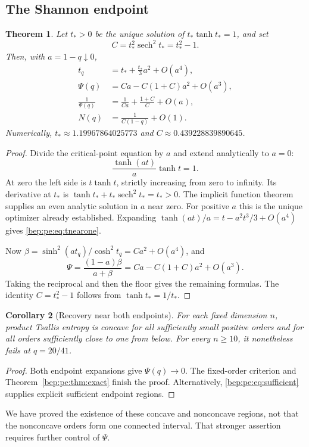 \documentclass[11pt]{article}
\numberwithin{equation}{section}
\newtheorem{theorem}{Theorem}[section]
\newtheorem{corollary}[theorem]{Corollary}
\theoremstyle{definition}
\theoremstyle{remark}
\newcommand{\sech}{\operatorname{sech}}
\begin{document}
\subsection{The Shannon endpoint}
\begin{theorem}\label{bep:pe:thm:nearone}
Let $t_*>0$ be the unique solution of $t_*\tanh t_*=1$, and set
\begin{equation}
 C=t_*^2\sech^2t_*=t_*^2-1.
\end{equation}
Then, with $a=1-q\downarrow0$,
\begin{align}
 t_q&=t_*+\frac{t_*}{3}a^2+O(a^4),\label{bep:pe:eq:tnearone}\\
 \Psi(q)&=Ca-C(1+C)a^2+O(a^3),\label{bep:pe:eq:psinearone}\\
 \frac1{\Psi(q)}&=\frac1{Ca}+\frac{1+C}{C}+O(a),\label{bep:pe:eq:recipnearone}\\
 N(q)&=\frac1{C(1-q)}+O(1).
\end{align}
Numerically, $t_*\approx1.19967864025773$ and
$C\approx0.439228839890645$.
\end{theorem}
\begin{proof}
Divide the critical-point equation by $a$ and extend analytically to
$a=0$:
\begin{equation}
 \frac{\tanh(at)}a\tanh t=1.
\end{equation}
At zero the left side is $t\tanh t$, strictly increasing from zero to
infinity. Its derivative at $t_*$ is
$\tanh t_*+t_*\sech^2t_*=t_*>0$.
The implicit function theorem supplies an even analytic solution in
$a$ near zero. For positive $a$ this is the unique optimizer already
established. Expanding $\tanh(at)/a=t-a^2t^3/3+O(a^4)$ gives
\eqref{bep:pe:eq:tnearone}.

Now $\beta=\sinh^2(at_q)/\cosh^2t_q=Ca^2+O(a^4)$, and
\[
 \Psi=\frac{(1-a)\beta}{a+\beta}
 =Ca-C(1+C)a^2+O(a^3).
\]
Taking the reciprocal and then the floor gives the remaining formulas.
The identity $C=t_*^2-1$ follows from $\tanh t_*=1/t_*$.
\end{proof}

\begin{corollary}[Recovery near both endpoints]\label{bep:pe:cor:recovery}
For each fixed dimension $n$, product Tsallis entropy is concave for
all sufficiently small positive orders and for all orders sufficiently
close to one from below. For every $n\geq10$, it nonetheless fails at
$q=20/41$.
\end{corollary}
\begin{proof}
Both endpoint expansions give $\Psi(q)\to0$. The fixed-order criterion
and Theorem~\ref{bep:pe:thm:exact} finish the proof. Alternatively,
\eqref{bep:pe:eq:sufficient} supplies explicit sufficient endpoint regions.
\end{proof}
We have proved the existence of these concave and nonconcave regions,
not that the nonconcave orders form one connected interval. That
stronger assertion requires further control of $\Psi$.
\end{document}

